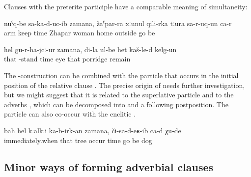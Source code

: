 Clauses with the preterite participle have a comparable meaning of simultaneity:
%
\begin{exe}
	\ex	\label{ex:‎While he presented the condolences (lit. kept his hands in front), Zhapar's wife entered}
	\gll	nuˁq-be	sa-ka-d-uc-ib		zamana,	žaˁpar-ra	xːunul	qili-rka	tːura	sa-r-uq-un	ca-r\\
		arm	keep	time	Zhapar	woman	home	outside 	go	be\\
	\glt	{}

	\ex	\label{ex:‎While I got up, my eyes remained on the porridge}
	\gll	hel	gu-r-ha-jcː-ur	zamana,	di-la	ul-be	het	kaš-le-d	kelg-un\\
		that	-stand	time		eye	that	porridge	remain\\
	\glt	{}
\end{exe}

The -construction can be combined with the particle   that occurs in the initial position of the relative clause . The precise origin of  needs further investigation, but we might suggest that it is related to the superlative particle   and to the adverbs  , which can be decomposed into  and a following postposition. The particle can also co-occur with the enclitic .
%
\begin{exe}
	\ex	\label{ex:‎When this tree already felt down, the dogs were coming}
	\gll	bah	hel	kːalkːi	ka-b-irk-an	zamana,	či-sa-d-eʁ-ib	ca-d	χu-de\\
		immediately.when	that	tree	occur	time	go	be	dog\\
	\glt	{}
\end{exe}



\subsection{Minor ways of forming adverbial clauses}
\label{sec:minor ways of forming adverbial clauses}

